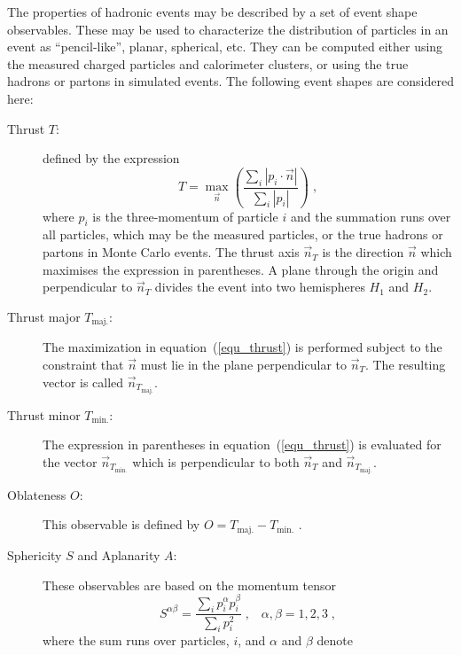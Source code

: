 \documentclass[12pt,a4paper,twoside]{article}
\newcommand{\tma}    {\ensuremath{T_{\mathrm{maj.}}}}
\newcommand{\tmi}    {\ensuremath{T_{\mathrm{min.}}}}
\newcommand{\bm}[1]  {\mbox{\boldmath\ensuremath{#1}}}
\begin{document}
The properties of hadronic events may be described by a set of
event shape observables.  These may be used to characterize the
distribution of particles in an event as ``pencil-like'',
planar, spherical, etc.
They can be computed either using the measured charged particles
and calorimeter clusters, or using the true hadrons or partons in
simulated events.
The following event shapes are considered here:
\begin{description}
\item[Thrust \bm{T}:]
  defined by the expression\cite{thrust1,thrust2}
  \begin{equation}
  T= \max_{\vec{n}}\left(\frac{\sum_i|p_i\cdot\vec{n}|}
                    {\sum_i|p_i|}\right)\;,
  \label{equ_thrust}
  \end{equation}
  where $p_i$ is the three-momentum of particle $i$ and
  the summation runs over all particles, which may be 
  the measured particles, or the true hadrons 
  or partons in Monte Carlo events.  
  The thrust axis $\vec{n}_T$ is the direction $\vec{n}$ which
  maximises the expression in parentheses.  A plane through the origin
  and perpendicular to $\vec{n}_T$ divides the event into two
  hemispheres $H_1$ and $H_2$.
\item[Thrust major \bm{\tma}:]
The maximization in equation~(\ref{equ_thrust}) is performed subject to 
 the constraint that
  $\vec{n}$ must lie in the plane perpendicular to $\vec{n}_T$. The
  resulting vector is called $\vec{n}_{\tma}$.
\item[Thrust minor \bm{\tmi}:]
  The expression in parentheses in equation~(\ref{equ_thrust})
 is evaluated for the vector
  $\vec{n}_{\tmi}$ which is perpendicular to both $\vec{n}_T$ and 
  $\vec{n}_{\tma}$.
\item[Oblateness \bm{O}:] 
  This observable is defined by $O=\tma-\tmi$ \cite{def_o}.
\item[Sphericity \bm{S} and Aplanarity \bm{A}:] 
  These observables are based on the momentum tensor
  \begin{equation}
    S^{\alpha\beta}= \frac{\sum_ip_i^{\alpha}p_i^{\beta}}{\sum_ip_i^2}\;,
    \;\;\;\alpha,\beta= 1,2,3\;,
  \end{equation}
  where the sum runs over particles, $i$, and $\alpha$ and $\beta$ denote 

\end{description}
\end{document}
